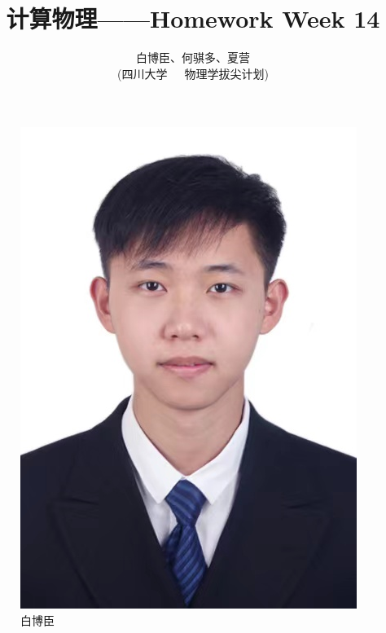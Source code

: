 \documentclass[12pt,a4paper]{article}%
\title{\fontsize{18pt}{27pt}\selectfont%
    {\heiti%
        计算物理——Homework Week 14}}%
\author{\fontsize{12pt}{18pt}\selectfont%
    {\fangsong%
        白博臣、何骐多、夏营}\\%
    \fontsize{10.5pt}{15.75pt}\selectfont%
    {\fangsong%
        (四川大学~~~物理学拔尖计划)}}%
\date{}%
\begin{document}
\maketitle%
\lhead{}%
\chead{}%
\rhead{}%
\lfoot{}%
\cfoot{\thepage}%
\rfoot{}%
\begin{figure}[h]
    \centering
    \begin{minipage}{0.32\textwidth}
        \centering
        \includegraphics[width=\linewidth]{bbc}
        \caption{白博臣}
        \label{白博臣照片}
    \end{minipage}\hfill
    \begin{minipage}{0.305\textwidth}

\end{minipage}
\end{figure}
\end{document}
